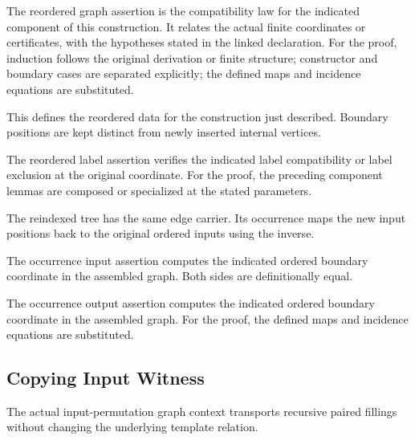 The reordered graph assertion is the compatibility law for the indicated component of this construction. It relates the actual finite coordinates or certificates, with the hypotheses stated in the linked declaration.
For the proof, induction follows the original derivation or finite structure; constructor and boundary cases are separated explicitly; the defined maps and incidence equations are substituted.
\par{}

This defines the reordered data for the construction just described. Boundary positions are kept distinct from newly inserted internal vertices.
\par{}

The reordered label assertion verifies the indicated label compatibility or label exclusion at the original coordinate.
For the proof, the preceding component lemmas are composed or specialized at the stated parameters.
\par{}

The reindexed tree has the same edge carrier. Its occurrence maps the new input positions back to the original ordered inputs using the inverse.
\par{}

The occurrence input assertion computes the indicated ordered boundary coordinate in the assembled graph.
Both sides are definitionally equal.
\par{}

The occurrence output assertion computes the indicated ordered boundary coordinate in the assembled graph.
For the proof, the defined maps and incidence equations are substituted.
\par{}

\subsection{Copying Input Witness}
The actual input-permutation graph context transports recursive paired fillings without changing the underlying template relation.

